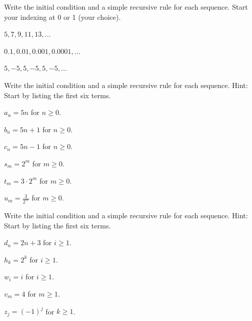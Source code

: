 \begin{exer}[\exerP] %
\label{exer_ntr_first}
    Write the initial condition and a simple recursive rule for each sequence.  Start your indexing at 0 or 1 (your choice). 
        \begin{exerpart}
            \item $5, 7, 9, 11, 13, \ldots$
            \item $0.1, 0.01, 0.001, 0.0001, \ldots$
            \item $5, -5, 5, -5, 5, -5, \ldots$
        \end{exerpart}
\end{exer}

\begin{exer}[\exerP] %
\label{exer_write_recursion_arith_geom}
    Write the initial condition and a simple recursive rule for each sequence.  Hint: Start by listing the first six terms.
        \begin{exerpart}
            \item $a_n = 5n$ for $n \ge 0$.
            \item $b_n=5n+1$ for $n \ge 0$.
            \item $c_n=5n-1$ for $n \ge 0$.
            \item $s_m = 2^m$ for $m \ge 0$.
            \item $t_m = 3\cdot 2^m$  for $m \ge 0$.
            \item $u_m = \frac{3}{2^m}$  for $m \ge 0$.
        \end{exerpart}    
\end{exer}

\begin{exer}[\exerP] %
\label{exer_write_recursion_more}
    Write the initial condition and a simple recursive rule for each sequence.  Hint: Start by listing the first six terms.
        \begin{exerpart}
            \item $d_n = 2n+3$ for $i \ge 1$.
            \item $h_k = 2^k$ for $i \ge 1$. 
            \item $w_i = i$ for $i \ge 1$.
            \item $v_m = 4$ for $m \ge 1$.
            \item $z_j = (-1)^j$ for $k \ge 1$.        
        \end{exerpart}
\end{exer}


